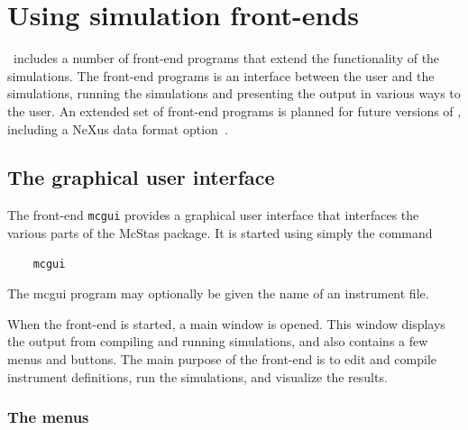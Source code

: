\section{Using simulation front-ends}
\label{s:frontends}

\MCS\ includes a number of front-end programs that extend the
functionality of the simulations. The front-end programs is an interface
between the user and the simulations, running the simulations and
presenting the output in various ways to the user.
An extended set of front-end programs is planned for future versions of
\MCS, including a NeXus data format option~\cite{nexus_webpage}.


\subsection{The graphical user interface}
\label{s:mcgui}

The front-end \verb+mcgui+ provides a graphical user interface that
interfaces the various parts of the McStas package. It is started using
simply the command
\begin{verbatim}
    mcgui
\end{verbatim}
The mcgui program may optionally be given the name of an instrument file.

When the front-end is started, a main window is opened. This window
displays the output from compiling and running simulations, and also
contains a few menus and buttons. The main purpose of the front-end is
to edit and compile instrument definitions, run the simulations, and
visualize the results.

\subsubsection{The menus}

